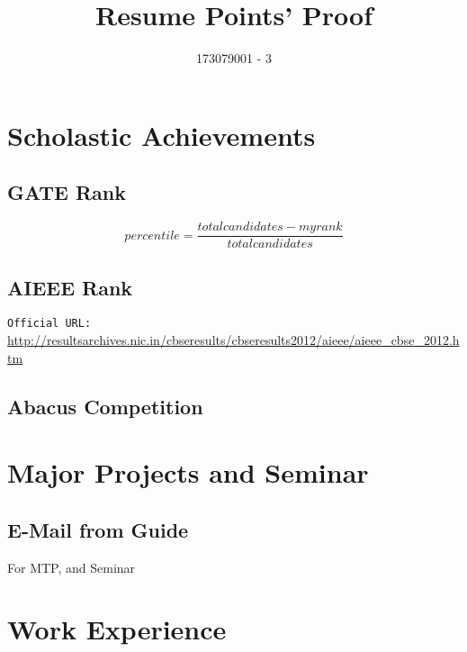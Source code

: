 \documentclass{article}
\title{Resume Points' Proof}
\author{173079001 - 3}
\date{}
\begin{document}
\maketitle
\tableofcontents
\newpage
\section{Scholastic Achievements}
	\subsection{GATE Rank}
		$$percentile = \frac{total candidates - myrank }{total candidates}$$
		\begin{figure}[h]
		\end{figure}

\newpage
	\subsection{AIEEE Rank}
		\texttt{Official URL:} \url{http://resultsarchives.nic.in/cbseresults/cbseresults2012/aieee/aieee_cbse_2012.htm}
		\begin{figure}[h]
		\end{figure}
		
\newpage
	\subsection{Abacus Competition}
		\begin{figure}[h]
		\end{figure}
\newpage
\section{Major Projects and Seminar}
	\subsection{E-Mail from Guide}
		For MTP, and Seminar
		\begin{figure}[h]
		\end{figure}
\newpage
\section{Work Experience}
\end{document}
